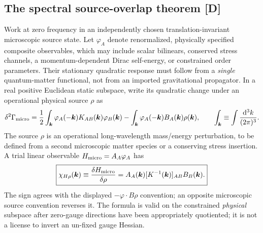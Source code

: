 \documentclass[11pt,a4paper]{article}
\begin{document}
\subsection{The spectral source-overlap theorem [D]}\label{sec:v09-source-overlap}
Work at zero frequency in an independently chosen translation-invariant microscopic source state. Let $\varphi_A$ denote renormalized, physically specified composite observables, which may include scalar bilinears, conserved stress channels, a momentum-dependent Dirac self-energy, or constrained order parameters. Their stationary quadratic response must follow from a \emph{single} quantum-matter functional, not from an imported gravitational propagator. In a real positive Euclidean static subspace, write its quadratic change under an operational physical source $\rho$ as
\begin{equation}\label{eq:v09-general-functional}
\delta^2\Gamma_{\rm micro}=\frac12\int_{\bm k}\varphi_A(-\bm k)K_{AB}(\bm k)\varphi_B(\bm k)
-\int_{\bm k}\varphi_A(-\bm k)B_A(\bm k)\rho(\bm k),\qquad
\int_{\bm k}\equiv\int\frac{\mathrm d^3k}{(2\pi)^3}.
\end{equation}
The source $\rho$ is an operational long-wavelength mass/energy perturbation, to be defined from a second microscopic matter species or a conserving stress insertion. A trial linear observable $H_{\rm micro}=A_A\varphi_A$ has
\begin{equation}\label{eq:v09-susceptibility}
\boxed{\chi_{H\rho}(\bm k)\equiv\frac{\delta H_{\rm micro}}{\delta\rho}
=A_A(\bm k)[K^{-1}(\bm k)]_{AB}B_B(\bm k).}
\end{equation}
The sign agrees with the displayed $-\varphi\cdot B\rho$ convention; an opposite microscopic source convention reverses it. The formula is valid on the constrained \emph{physical} subspace after zero-gauge directions have been appropriately quotiented; it is not a license to invert an un-fixed gauge Hessian.
\end{document}
